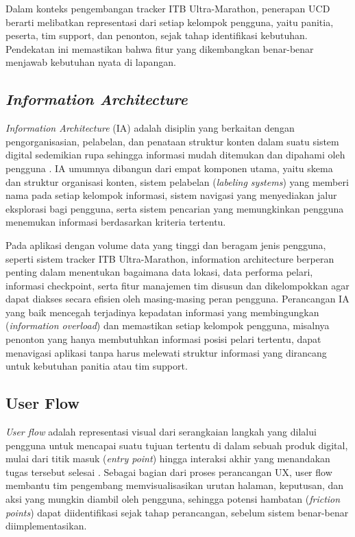 Dalam konteks pengembangan tracker ITB Ultra-Marathon, penerapan UCD berarti melibatkan representasi dari setiap kelompok pengguna, yaitu panitia, peserta, tim support, dan penonton, sejak tahap identifikasi kebutuhan. Pendekatan ini memastikan bahwa fitur yang dikembangkan benar-benar menjawab kebutuhan nyata di lapangan.

\subsection{\textit{Information Architecture}}
\textit{Information Architecture} (IA) adalah disiplin yang berkaitan dengan pengorganisasian, pelabelan, dan penataan struktur konten dalam suatu sistem digital sedemikian rupa sehingga informasi mudah ditemukan dan dipahami oleh pengguna \cite{rosenfeld2015}. IA umumnya dibangun dari empat komponen utama, yaitu skema dan struktur organisasi konten, sistem pelabelan (\textit{labeling systems}) yang memberi nama pada setiap kelompok informasi, sistem navigasi yang menyediakan jalur eksplorasi bagi pengguna, serta sistem pencarian yang memungkinkan pengguna menemukan informasi berdasarkan kriteria tertentu.
 
Pada aplikasi dengan volume data yang tinggi dan beragam jenis pengguna, seperti sistem tracker ITB Ultra-Marathon, information architecture berperan penting dalam menentukan bagaimana data lokasi, data performa pelari, informasi checkpoint, serta fitur manajemen tim disusun dan dikelompokkan agar dapat diakses secara efisien oleh masing-masing peran pengguna. Perancangan IA yang baik mencegah terjadinya kepadatan informasi yang membingungkan (\textit{information overload}) dan memastikan setiap kelompok pengguna, misalnya penonton yang hanya membutuhkan informasi posisi pelari tertentu, dapat menavigasi aplikasi tanpa harus melewati struktur informasi yang dirancang untuk kebutuhan panitia atau tim support.
 
\subsection{User Flow}
\label{subsec:user-flow}
 
\textit{User flow} adalah representasi visual dari serangkaian langkah yang dilalui pengguna untuk mencapai suatu tujuan tertentu di dalam sebuah produk digital, mulai dari titik masuk (\textit{entry point}) hingga interaksi akhir yang menandakan tugas tersebut selesai \cite{garrett2011}. Sebagai bagian dari proses perancangan UX, user flow membantu tim pengembang memvisualisasikan urutan halaman, keputusan, dan aksi yang mungkin diambil oleh pengguna, sehingga potensi hambatan (\textit{friction points}) dapat diidentifikasi sejak tahap perancangan, sebelum sistem benar-benar diimplementasikan.
 
